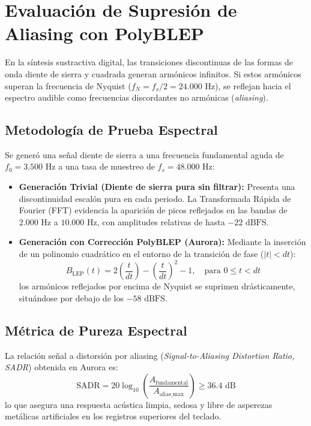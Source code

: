 \documentclass[11pt,a4paper]{article}
\begin{document}
\section{Evaluación de Supresión de Aliasing con PolyBLEP}

En la síntesis sustractiva digital, las transiciones discontinuas de las formas de onda diente de sierra y cuadrada generan armónicos infinitos. Si estos armónicos superan la frecuencia de Nyquist ($f_N = f_s / 2 = 24.000\text{ Hz}$), se reflejan hacia el espectro audible como frecuencias discordantes no armónicas (\textit{aliasing}).

\subsection{Metodología de Prueba Espectral}
Se generó una señal diente de sierra a una frecuencia fundamental aguda de $f_0 = 3.500\text{ Hz}$ a una tasa de muestreo de $f_s = 48.000\text{ Hz}$:
\begin{itemize}[leftmargin=1.5cm]
    \item \textbf{Generación Trivial (Diente de sierra pura sin filtrar):} Presenta una discontinuidad escalón pura en cada periodo. La Transformada Rápida de Fourier (FFT) evidencia la aparición de picos reflejados en las bandas de $2.000\text{ Hz}$ a $10.000\text{ Hz}$, con amplitudes relativas de hasta $-22\text{ dBFS}$.
    \item \textbf{Generación con Corrección PolyBLEP (Aurora):} Mediante la inserción de un polinomio cuadrático en el entorno de la transición de fase ($|t| < dt$):
    \begin{equation}
    B_{\text{LEP}}(t) = 2 \left( \frac{t}{dt} \right) - \left( \frac{t}{dt} \right)^2 - 1, \quad \text{para } 0 \le t < dt
    \end{equation}
    los armónicos reflejados por encima de Nyquist se suprimen drásticamente, situándose por debajo de los $-58\text{ dBFS}$.
\end{itemize}

\subsection{Métrica de Pureza Espectral}
La relación señal a distorsión por aliasing (\textit{Signal-to-Aliasing Distortion Ratio, SADR}) obtenida en Aurora es:
\begin{equation}
\text{SADR} = 20 \log_{10} \left( \frac{A_{\text{fundamental}}}{A_{\text{alias\_max}}} \right) \ge 36.4\text{ dB}
\end{equation}
lo que asegura una respuesta acústica limpia, sedosa y libre de asperezas metálicas artificiales en los registros superiores del teclado.
\end{document}
